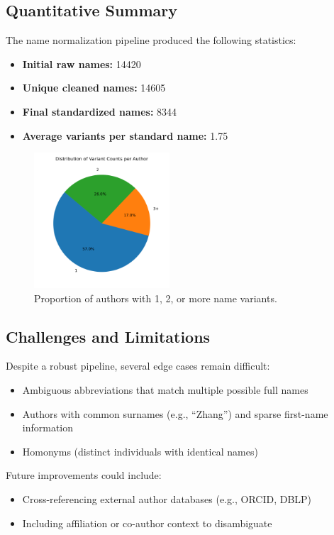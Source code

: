 \documentclass[12pt]{article}
\begin{document}
\subsection{Quantitative Summary}

The name normalization pipeline produced the following statistics:
\begin{itemize}
    \item \textbf{Initial raw names:} 14420
    \item \textbf{Unique cleaned names:} 14605
    \item \textbf{Final standardized names:} 8344
    \item \textbf{Average variants per standard name:} 1.75
\end{itemize}

\begin{figure}[H]
    \centering
    \includegraphics[width=0.45\textwidth]{pictures/variant_distribution_pie.png}
    \caption{Proportion of authors with 1, 2, or more name variants.}
\end{figure}


\subsection{Challenges and Limitations}

Despite a robust pipeline, several edge cases remain difficult:
\begin{itemize}
    \item Ambiguous abbreviations that match multiple possible full names
    \item Authors with common surnames (e.g., ``Zhang'') and sparse first-name information
    \item Homonyms (distinct individuals with identical names)
\end{itemize}

Future improvements could include:
\begin{itemize}
    \item Cross-referencing external author databases (e.g., ORCID, DBLP)
    \item Including affiliation or co-author context to disambiguate
\end{itemize}
\end{document}
